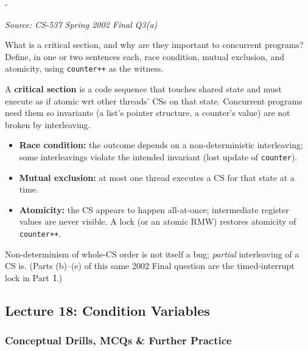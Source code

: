 \documentclass[11pt,a4paper]{article}
\makeatletter
\newcommand{\keepspace}[1]{\par\penalty-100\begingroup
  \setlength{\dimen@}{#1}\dimen@ii\pagegoal\advance\dimen@ii-\pagetotal
  \ifdim\dimen@>\dimen@ii\ifdim\dimen@ii>\z@\vfil\fi\break\fi\endgroup}
\newcounter{qn}[section]
\newenvironment{Qn}[4]{%
  \refstepcounter{qn}\keepspace{7\baselineskip}%
  \begin{tcolorbox}[qboxstyle, title={Q\thesection.\theqn\ \ [#1 \textbar\ #2]\ \ #4}]%
  {\footnotesize\color{g3}\textit{Source: #3}}\par\smallskip%
}{%
  \end{tcolorbox}%
}
\newenvironment{Sol}{%
  \begin{tcolorbox}[sboxstyle, title={Solution}]%
}{%
  \end{tcolorbox}\vspace{0.35em}%
}
\makeatother
\begin{document}
\begin{Qn}{Easy-Medium}{Lect 16}{CS-537 Spring 2002 Final Q3(a)}{Race, critical section, mutual exclusion, atomicity}
What is a critical section, and why are they important to concurrent programs? Define, in one or two sentences each, race condition, mutual exclusion, and atomicity, using \texttt{counter++} as the witness.
\end{Qn}
\begin{Sol}
A \textbf{critical section} is a code sequence that touches shared state and must execute as if atomic wrt other threads' CSs on that state. Concurrent programs need them so invariants (a list's pointer structure, a counter's value) are not broken by interleaving.

\begin{itemize}
\item \textbf{Race condition:} the outcome depends on a non-deterministic interleaving; some interleavings violate the intended invariant (lost update of \texttt{counter}).
\item \textbf{Mutual exclusion:} at most one thread executes a CS for that state at a time.
\item \textbf{Atomicity:} the CS appears to happen all-at-once; intermediate register values are never visible. A lock (or an atomic RMW) restores atomicity of \texttt{counter++}.
\end{itemize}

Non-determinism of whole-CS order is not itself a bug; \emph{partial} interleaving of a CS is. (Parts (b)--(e) of this same 2002 Final question are the timed-interrupt lock in Part~I.)
\end{Sol}

\subsection{Lecture 18: Condition Variables}

\subsubsection*{Conceptual Drills, MCQs \& Further Practice}
\end{document}
